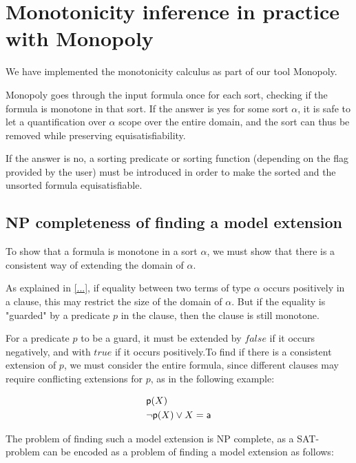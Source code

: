 \section{Monotonicity inference in practice with Monopoly}


We have implemented the monotonicity calculus as part of our tool
Monopoly.

Monopoly goes through the input formula once for each sort, checking if
the formula is monotone in that sort. If the answer is yes for some sort $\alpha$,
it is safe to let a quantification over $\alpha$ scope over the entire domain,
and the sort can thus be removed while preserving equisatisfiability. 

If the answer is no, a sorting predicate or sorting function (depending on the
flag provided by the user) must be introduced in order to make the sorted and the 
unsorted formula equisatisfiable.

\subsection{NP completeness of finding a model extension}

  To show that a formula is monotone in a sort $\alpha$, we must show that there is
  a consistent way of extending the domain of $\alpha$. 

  As explained in \ref{...}, if equality between two terms of type $\alpha$ occurs 
  positively in a clause, this may restrict the size of the domain of $\alpha$. But if 
  the equality is "guarded" by a predicate $p$ in the clause, then the clause is still monotone.

  For a predicate $p$ to be a guard, it must be extended by $false$ if it occurs negatively,
  and with $true$ if it occurs positively.To find if there is a consistent extension of $p$, 
  we must consider the entire formula, since different clauses may require conflicting 
  extensions for $p$, as in the following example:

  \begin{example}
\label{ex:extension_conflict}

\begin{eqnarray}
 & \mbox{\sf p}(X) \\
 & \neg \mbox{\sf p}(X) \lor X = \mbox{\sf a} 
\end{eqnarray}
\end{example}
 
  The problem of finding such a model extension is NP complete, as a SAT-problem can be 
  encoded as a problem of finding a model extension as follows:

